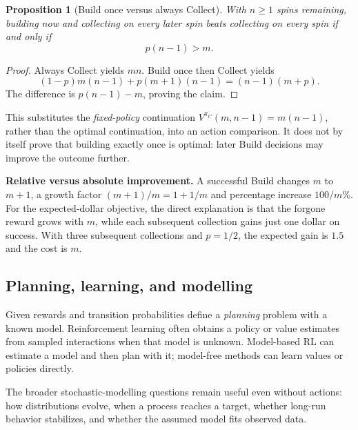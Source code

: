 \documentclass[11pt]{article}
\newtheorem{proposition}[definition]{Proposition}
\theoremstyle{remark}\newtheorem{remark}[definition]{Remark}
\begin{document}
\begin{proposition}[Build once versus always Collect]
With $n\geq1$ spins remaining, building now and collecting on every later spin beats collecting on every spin if and only if
\[
p(n-1)>m.
\]
\end{proposition}
\begin{proof}
Always Collect yields $mn$. Build once then Collect yields
\[
(1-p)m(n-1)+p(m+1)(n-1)=(n-1)(m+p).
\]
The difference is $p(n-1)-m$, proving the claim.
\end{proof}
This substitutes the \emph{fixed-policy} continuation $V^{\pi_C}(m,n-1)=m(n-1)$, rather than the optimal continuation, into an action comparison. It does not by itself prove that building exactly once is optimal: later Build decisions may improve the outcome further.

\textbf{Relative versus absolute improvement.} A successful Build changes $m$ to $m+1$, a growth factor $(m+1)/m=1+1/m$ and percentage increase $100/m\%$. For the expected-dollar objective, the direct explanation is that the forgone reward grows with $m$, while each subsequent collection gains just one dollar on success. With three subsequent collections and $p=1/2$, the expected gain is $1.5$ and the cost is $m$.

\subsection{Planning, learning, and modelling}
Given rewards and transition probabilities define a \emph{planning} problem with a known model. Reinforcement learning often obtains a policy or value estimates from sampled interactions when that model is unknown. Model-based RL can estimate a model and then plan with it; model-free methods can learn values or policies directly.

The broader stochastic-modelling questions remain useful even without actions: how distributions evolve, when a process reaches a target, whether long-run behavior stabilizes, and whether the assumed model fits observed data.

\newpage
\end{document}
